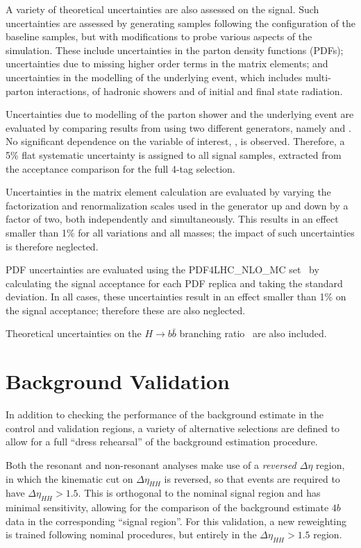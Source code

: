 A variety of theoretical uncertainties are also assessed on the signal. Such uncertainties 
are assessed by generating samples following the configuration of the baseline samples,
but with modifications to probe various aspects of the simulation. These include
uncertainties in the parton density functions (PDFs); uncertainties due to
missing higher order terms in the matrix elements; and uncertainties in the
modelling of the underlying event, which includes multi-parton interactions, of
hadronic showers and of initial and final state radiation. 

Uncertainties due to modelling of the parton shower and the underlying event are 
evaluated by comparing results from using two different generators, namely \HERWIG[7.1.3]
and \PYTHIA[8.235]. No significant dependence on the variable of interest, \mhh, is observed.
Therefore, a 5\% flat systematic uncertainty is assigned to all signal samples, extracted from 
the acceptance comparison for the full 4-tag selection.

Uncertainties in the matrix element calculation are evaluated by varying the factorization 
and renormalization scales used in the generator up and down by a factor of two, both independently and simultaneously.
This results in an effect smaller than 1\% for all variations and all masses; the impact of such uncertainties 
is therefore neglected.

PDF uncertainties are evaluated using the PDF4LHC\_NLO\_MC set~\cite{Butterworth:2015oua} by 
calculating the signal acceptance for each PDF replica and taking the standard deviation. 
In all cases, these uncertainties result in an effect smaller than 1\% on the signal acceptance; 
therefore these are also neglected.

Theoretical uncertainties on the $H \to b\bar{b}$ branching ratio~\cite{deFlorian:2227475} are also 
included.

\FloatBarrier
\clearpage
\section{Background Validation}
\label{sec:bkgd-validation}
In addition to checking the performance of the background estimate in the control and 
validation regions, a variety of alternative selections are defined to allow for a 
full ``dress rehearsal'' of the background estimation procedure. 

Both the resonant and non-resonant analyses make use of a \emph{reversed $\Delta \eta$}
region, in which the kinematic cut on $\Delta \eta_{HH}$ is reversed, so that events are
required to have $\Delta \eta_{HH} > 1.5$. This is orthogonal to the nominal signal 
region and has minimal sensitivity, allowing for the comparison of the background
estimate $4b$ data in the corresponding ``signal region''. For this validation, 
a new reweighting is trained following nominal procedures, but entirely in the 
$\Delta \eta_{HH} > 1.5$ region.

